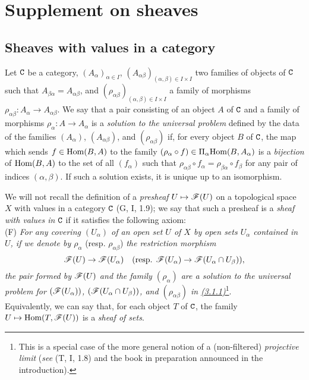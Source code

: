 \section{Supplement on sheaves}
\label{section-supplement-on-sheaves}

\subsection{Sheaves with values in a category}
\label{subsection-sheaves-with-values-in-cat}

\begin{env}[3.1.1]
\label{0.3.1.1}
Let $\mathtt{C}$ be a category, $(A_\alpha)_{\alpha\in I}$,
$(A_{\alpha\beta})_{(\alpha,\beta)\in I\times I}$ two families of objects of
$\mathtt{C}$ such that $A_{\beta\alpha}=A_{\alpha\beta}$, and
$(\rho_{\alpha\beta})_{(\alpha,\beta)\in I\times I}$ a family of morphisms
$\rho_{\alpha\beta}:A_\alpha\to A_{\alpha\beta}$. We say that a pair consisting
of an object $A$ of $\mathtt{C}$ and a family of morphisms $\rho_\alpha:A\to A_\alpha$
is a {\em solution to the universal problem} defined by the data of the
families $(A_\alpha)$, $(A_{\alpha\beta})$, and $(\rho_{\alpha\beta})$ if, for
every object $B$ of $\mathtt{C}$, the map which sends $f\in{\mathop{\mathrm{Hom}}\nolimits}(B,A)$ to the family
$(\rho_\alpha\circ f)\in\Pi_\alpha{\mathop{\mathrm{Hom}}\nolimits}(B,A_\alpha)$ is a {\em bijection} of
${\mathop{\mathrm{Hom}}\nolimits}(B,A)$ to the set of all $(f_\alpha)$ such that
$\rho_{\alpha\beta}\circ f_\alpha=\rho_{\beta\alpha}\circ f_\beta$ for any pair
of indices $(\alpha,\beta)$. If such a solution exists, it is unique up to an
isomorphism.
\end{env}

\begin{env}[3.1.2]
\label{0.3.1.2}
We will not recall the definition of a {\em presheaf} $U\mapsto\mathscr{F}(U)$ on a
topological space $X$ with values in a category $\mathtt{C}$ (G, I, 1.9); we say that
such a presheaf is a {\em sheaf with values in} $\mathtt{C}$ if it satisfies the
following axiom:\\

(F) {\em For any covering $(U_\alpha)$ of an open set $U$ of $X$ by open sets
    $U_\alpha$ contained in $U$, if we denote by $\rho_\alpha$}
    (resp. $\rho_{\alpha\beta}$) {\em the restriction morphism}
    \[
      \mathscr{F}(U)\to\mathscr{F}(U_\alpha)
      \quad(\text{resp. }\mathscr{F}(U_\alpha)\to\mathscr{F}(U_\alpha\cap U_\beta)),
    \]
    {\em the pair formed by $\mathscr{F}(U)$ and the family $(\rho_\alpha)$ are a
    solution to the universal problem for $(\mathscr{F}(U_\alpha))$,
    $(\mathscr{F}(U_\alpha\cap U_\beta))$, and $(\rho_{\alpha\beta})$ in
    \hyperref[0.3.1.1]{(3.1.1)}}\footnote{This is a special case of the more general
    notion of a (non-filtered) {\em projective limit} ({\em see} (T, I, 1.8)
    and the book in preparation announced in the introduction).}.\\

Equivalently, we can say that, for each object $T$ of $\mathtt{C}$, the family
$U\mapsto{\mathop{\mathrm{Hom}}\nolimits}(T,\mathscr{F}(U))$ is a {\em sheaf of sets}.
\end{env}

